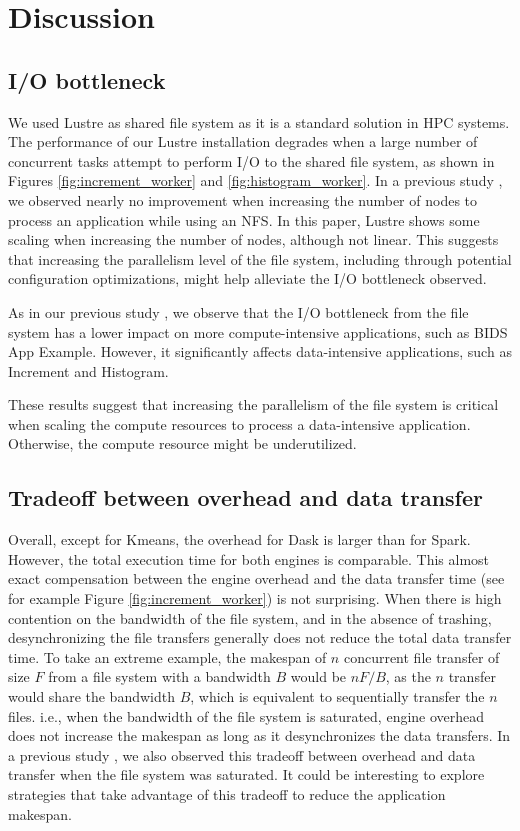 \documentclass[conference]{IEEEtran}
\begin{document}
\section{Discussion}
\subsection{I/O bottleneck}
We used Lustre as shared file system as it is a standard solution in HPC systems.
The performance of our Lustre installation degrades when a large number of concurrent tasks attempt to perform I/O to the shared file system, as shown in Figures \ref{fig:increment_worker} and \ref{fig:histogram_worker}.
In a previous study \cite{8943502}, we observed nearly no improvement when increasing the number of nodes to process an application while using an NFS.
In this paper, Lustre shows some scaling when increasing the number of nodes, although not linear.
This suggests that increasing the parallelism level of the file system, including through potential configuration optimizations, might help alleviate the I/O bottleneck observed.

As in our previous study \cite{8943502}, we observe that the I/O bottleneck from the file system has a lower impact on more compute-intensive applications, such as BIDS App Example.
However, it significantly affects data-intensive applications, such as Increment and Histogram.

These results suggest that increasing the parallelism of the file system is critical when scaling the compute resources to process a data-intensive application.
Otherwise, the compute resource might be underutilized.

\subsection{Tradeoff between overhead and data transfer}
Overall, except for Kmeans, the overhead for Dask is larger than for Spark.
However, the total execution time for both engines is comparable.
This almost exact compensation between the engine overhead and the data transfer time (see for example Figure \ref{fig:increment_worker}) is not surprising.
When there is high contention on the bandwidth of the file system, and in the absence of trashing, desynchronizing the file transfers generally does not reduce the total data transfer time.
To take an extreme example, the makespan of $n$ concurrent file transfer of size $F$ from a file system with a bandwidth $B$ would be $nF/B$,
as the $n$ transfer would share the bandwidth $B$, which is equivalent to sequentially transfer the $n$ files.
i.e., when the bandwidth of the file system is saturated, engine overhead does not increase the makespan as long as it desynchronizes the data transfers.
In a previous study \cite{8943502}, we also observed this tradeoff between overhead and data transfer when the file system was saturated.
It could be interesting to explore strategies that take advantage of this tradeoff to reduce the application makespan.
\end{document}
